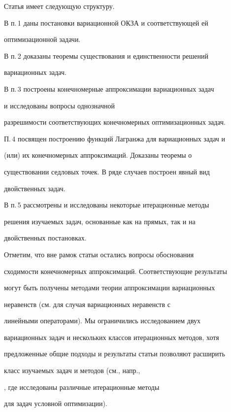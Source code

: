Статья имеет следующую структуру.





В п.\,1 даны постановки вариационной ОКЗА и соответствующей ей


оптимизационной задачи.


В п.\,2 доказаны теоремы существования и единственности решений


вариационных задач.


В п.\,3 построены конечномерные аппроксимации вариационных задач


и исследованы вопросы однозначной


разрешимости соответствующих конечномерных оптимизационных задач.


П.\,4 посвящен построению функций Лагранжа для вариационных задач и


(или) их конечномерных аппроксимаций. Доказаны теоремы о


существовании седловых точек. В ряде случаев построен явный вид


двойственных задач.


В п.\,5 рассмотрены и исследованы некоторые итерационные методы


решения изучаемых задач, основанные как на прямых, так и на


двойственных постановках.





Отметим, что вне рамок статьи остались вопросы обоснования


сходимости конечномерных аппроксимаций. Соответствующие результаты


могут быть получены методами теории аппроксимации вариационных


неравенств (см. \cite{Glova} для случая вариационных неравенств с


линейными операторами). Мы ограничились исследованием двух


вариационных задач и нескольких классов итерационных методов, хотя


предложенные общие подходы и результаты статьи позволяют расширить


класс изучаемых задач и методов (см., напр., 


\cite{Bert}, где исследованы различные итерационные методы


для задач условной оптимизации).








